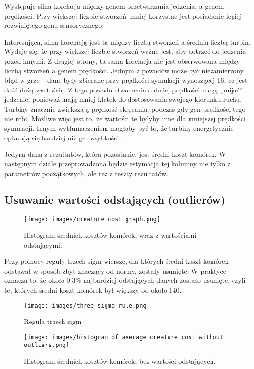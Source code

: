 \documentclass{article}
\begin{document}
Występuje silna korelacja między genem przetwarzania jedzenia, a genem prędkości. Przy większej liczbie stworzeń, mniej korzystne jest posiadanie lepiej rozwiniętego genu sensorycznego.

Interesującą, silną korelacją jest ta między liczbą stworzeń a średnią liczbą turbin. Wydaje się, że przy większej liczbie stworzeń ważne jest, aby dotrzeć do jedzenia przed innymi. Z drugiej strony, ta sama korelacja nie jest obserwowana między liczbą stworzeń a genem prędkości. Jednym z powodów może być niezamierzony błąd w grze – dane były zbierane przy prędkości symulacji wynoszącej 16, co jest dość dużą wartością. Z tego powodu stworzenia o dużej prędkości mogą „mijać” jedzenie, ponieważ mają mniej klatek do dostosowania swojego kierunku ruchu. Turbiny znacznie zwiększają prędkość skręcania, podczas gdy gen prędkości tego nie robi. Możliwe więc jest to, że wartości te byłyby inne dla mniejszej prędkości symulacji. Innym wytłumaczeniem mogłoby być to, że turbiny energetycznie opłacają się bardziej niż gen szybkości.

Jedyną daną z rezultatów, która pozostanie, jest średni koszt komórek. W następnym dziale przeprowadzona będzie estymacja tej kolumny nie tylko z parametrów początkowych, ale też z reszty rezultatów.

\subsection{Usuwanie wartości odstających (outlierów)}

\begin{figure}[H]
    \centering
    \texttt{[image: images/creature cost graph.png]}
    \caption{Histogram średnich kosztów komórek, wraz z wartościami odstającymi.}    
\end{figure}

Przy pomocy reguły trzech sigm wiersze, dla których średni koszt komórek odstawał w sposób zbyt znaczący od normy, zostały usunięte. W praktyce oznacza to, że około 0.3\% najbardziej odstających danych zostało usunięte, czyli te, których średni koszt komórek był większy od około 140.

\begin{figure}[H]
    \centering
    \texttt{[image: images/three sigma rule.png]}
    \caption{Reguła trzech sigm}
    \label{plt:three_sigm_rule}
\end{figure}

\begin{figure}[H]
    \centering
    \texttt{[image: images/histogram of average creature cost without outliers.png]}
    \caption{Histogram średnich kosztów komórek, bez wartości odstających.}    
\end{figure}
\end{document}
